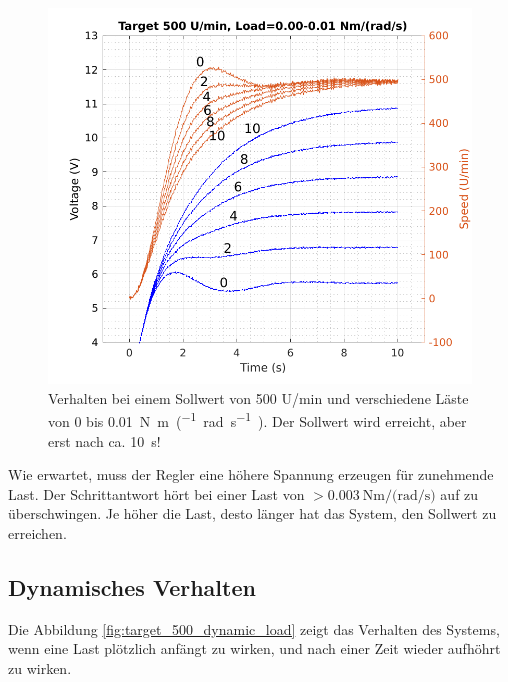 \begin{figure}[H]
    \centering
    \includegraphics[width=\imagewidth]{images/target_500_load_0-10}
    \caption{Verhalten bei einem Sollwert von 500 U/min und verschiedene L\"aste von 0 bis \SI{0.01}{\newton\meter\per(\radian\per\second)}. Der Sollwert wird erreicht, aber erst nach ca. \SI{10}{\second}!}
    \label{fig:target_500_load_0-10}
\end{figure}

Wie erwartet, muss der Regler eine h\"ohere Spannung erzeugen f\"ur zunehmende
Last.     Der     Schrittantwort     h\"ort     bei     einer     Last     von
$>\SI{0.003}{\newton\meter\per(\radian\per\second)}$  auf zu  \"uberschwingen.
Je h\"oher die Last, desto l\"anger hat das System, den Sollwert zu erreichen.


\subsection{Dynamisches Verhalten}

Die  Abbildung  \ref{fig:target_500_dynamic_load}  zeigt   das  Verhalten  des
Systems, wenn eine Last pl\"otzlich anf\"angt  zu  wirken, und nach einer Zeit
wieder aufh\"ohrt zu wirken.

